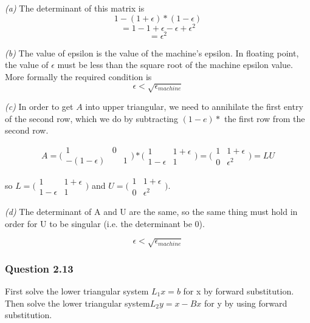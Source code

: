 \documentclass{article}
\begin{document}
\textit{(a)}
The determinant of this matrix is
$$1 - (1 + \epsilon) * (1 - \epsilon)$$
$$= 1 - 1 + \epsilon - \epsilon + \epsilon^2$$
$$ = \epsilon^2$$

\textit{(b)}
The value of epsilon is the value of the machine's epsilon.
In floating point, the value of $\epsilon$ must be less than
the square root of the machine epsilon value. More formally the
required condition is
$$\epsilon < \sqrt{\epsilon_{machine}}$$

\textit{(c)}
In order to get $A$ into upper triangular, we need to annihilate the first
entry of the second row, which we do by subtracting $(1-e) *$ the first row
from the second row.

$$A = \bigl( \begin{smallmatrix}
		   1 & 0\\
    	   -(1 - \epsilon) && 1
           \end{smallmatrix} \bigr)
           * \bigl( \begin{smallmatrix} 
			  1 & 1 + \epsilon\\
  			  1 - \epsilon & 1 
			\end{smallmatrix} \bigr)
		= \bigl( \begin{smallmatrix} 
			  1 & 1 + \epsilon\\
  			  0 & \epsilon^2 
			\end{smallmatrix} \bigr) = LU$$
			
so $L =\bigl( \begin{smallmatrix} 
			  1 & 1 + \epsilon\\
  			  1 - \epsilon & 1 
			\end{smallmatrix} \bigr)$
and $U = \bigl( \begin{smallmatrix} 
			  1 & 1 + \epsilon\\
  			  0 & \epsilon^2 
			\end{smallmatrix} \bigr).$
			
\textit{(d)}
The determinant of A and U are the same, so the same thing must hold
in order for U to be singular (i.e. the determinant be 0).

$$\epsilon < \sqrt{\epsilon_{machine}}$$

\subsubsection{Question 2.13}
First solve the lower triangular system $L_1 x = b$ for x by forward substitution. Then
solve the lower triangular system$L_2 y = x - Bx$ for y by using forward substitution.
\end{document}
